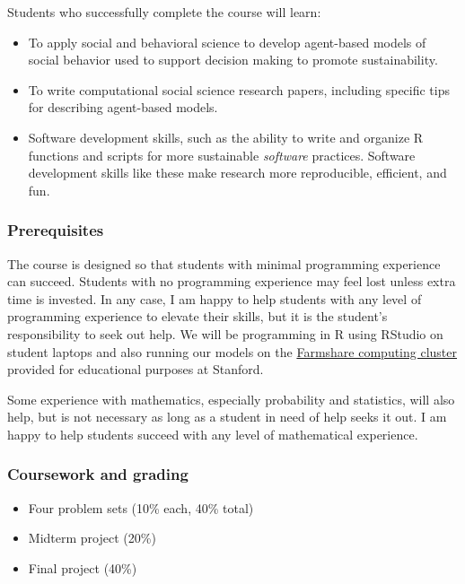 \documentclass[
  letterpaper,
  DIV=11,
  numbers=noendperiod]{scrartcl}
\providecommand{\tightlist}{%
  \setlength{\itemsep}{0pt}\setlength{\parskip}{0pt}}\usepackage{longtable,booktabs,array}
\begin{document}
Students who successfully complete the course will learn:

\begin{itemize}
\tightlist
\item
  To apply social and behavioral science to develop agent-based models
  of social behavior used to support decision making to promote
  sustainability.
\item
  To write computational social science research papers, including
  specific tips for describing agent-based models.
\item
  Software development skills, such as the ability to write and organize
  R functions and scripts for more sustainable \emph{software}
  practices. Software development skills like these make research more
  reproducible, efficient, and fun.
\end{itemize}

\subsubsection{Prerequisites}\label{prerequisites}

The course is designed so that students with minimal programming
experience can succeed. Students with no programming experience may feel
lost unless extra time is invested. In any case, I am happy to help
students with any level of programming experience to elevate their
skills, but it is the student's responsibility to seek out help. We will
be programming in R using RStudio on student laptops and also running
our models on the \href{https://srcc.stanford.edu/farmshare}{Farmshare
computing cluster} provided for educational purposes at Stanford.

Some experience with mathematics, especially probability and statistics,
will also help, but is not necessary as long as a student in need of
help seeks it out. I am happy to help students succeed with any level of
mathematical experience.

\subsubsection{Coursework and grading}\label{coursework-and-grading}

\begin{itemize}
\tightlist
\item
  Four problem sets (10\% each, 40\% total)
\item
  Midterm project (20\%)
\item
  Final project (40\%)
\end{itemize}
\end{document}
